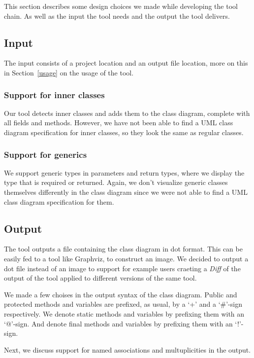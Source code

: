 This section describes some design choices we made while developing the tool chain. 
As well as the input the tool needs and the output the tool delivers.

\subsection{Input}
	The input consists of a project location and an output file location, more on this in Section~\ref{usage} on the usage of the tool.

	\subsubsection{Support for inner classes}
		Our tool detects inner classes and adds them to the class diagram, complete with all fields and methods. 
		However, we have not been able to find a UML class diagram specification for inner classes, so they look the same as regular classes.
		
		
	\subsubsection{Support for generics}
		We support generic types in parameters and return types, where we display the type that is required or returned.
		Again, we don't visualize generic classes themselves differently in the class diagram since we were not able to find a UML class diagram specification for them.

\subsection{Output}
	The tool outputs a file containing the class diagram in dot format. 
	This can be easily fed to a tool like Graphviz, to construct an image.
	We decided to output a dot file instead of an image to support for example users craeting a \textit{Diff} of the output of the tool 	applied to different versions of the same tool.
	
	We made a few choises in the output syntax of the class diagram. 
	Public and protected methods and variables are prefixed, as usual, by a `+' and a `\#'-sign respectively.
	We denote static methods and variables by prefixing them with an `@'-sign.
	And denote final methods and variables by prefixing them with an `!'-sign.
	
	Next, we discuss support for named associations and multuplicities in the output.

